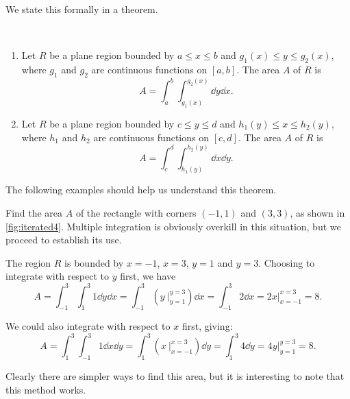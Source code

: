 We state this formally in a theorem.

\begin{theorem}\label{thm:area_plane_region}
\mbox{}\\[-2\baselineskip]\parbox[t]{\linewidth}{%
\begin{enumerate}
	\item Let $R$ be a plane region bounded by $a\leq x\leq b$ and $g_1(x)\leq y\leq g_2(x)$, where $g_1$ and $g_2$ are continuous functions on $[a,b]$. The area $A$ of $R$ is
	\[A = \int_a^b\int_{g_1(x)}^{g_2(x)} \dd y\dd x.\]
	\item Let $R$ be a plane region bounded by $c\leq y\leq d$ and $h_1(y)\leq x\leq h_2(y)$, where $h_1$ and $h_2$ are continuous functions on $[c,d]$. The area $A$ of $R$ is
	\[A = \int_c^d\int_{h_1(y)}^{h_2(y)} \dd x\dd y.\]
\end{enumerate}}
\end{theorem}

The following examples should help us understand this theorem.

\begin{example}\label{ex_iterated4}
Find the area $A$ of the rectangle with corners $(-1,1)$ and $(3,3)$, as shown in \autoref{fig:iterated4}.
\solution
Multiple integration is obviously overkill in this situation, but we proceed to establish its use.


The region $R$ is bounded by $x=-1$, $x=3$, $y=1$ and $y=3$. Choosing to integrate with respect to $y$ first, we have 
\[
 A = \int_{-1}^3\int_1^3 1\dd y\dd x
 = \int_{-1}^3 \left(y\ \Big|_{y=1}^{y=3}\right)\dd x
 = \int_{-1}^3 2\dd x = 2x\Big|_{x=-1}^{x=3}=8.
\]

We could also integrate with respect to $x$ first, giving:
\[
 A = \int_1^3\int_{-1}^3 1\dd x \dd y
 =\int_1^3 \left(x\ \Big|_{x=-1}^{x=3}\right)\dd y
 = \int_1^3 4\dd y = 4y\Big|_{y=1}^{y=3} = 8.
\]

Clearly there are simpler ways to find this area, but it is interesting to note that this method works.
\end{example}


